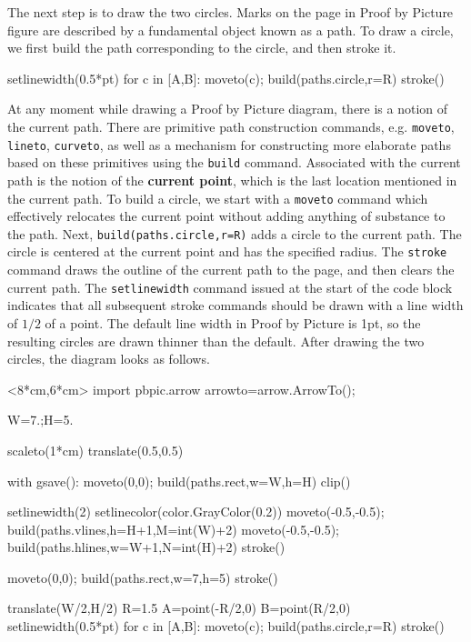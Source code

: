 \documentclass[12pt]{article}
\def\code#1{{\tt #1}}
\def\define#1{{\bf #1}}
\begin{document}
The next step is to draw the two circles.  Marks on the page
in Proof by Picture figure are described by a fundamental object known
as a path.  To draw a circle, we first build the path corresponding
to the circle, and then stroke it.
\begin{snippet}
setlinewidth(0.5*pt)
for c in [A,B]:
  moveto(c);
  build(paths.circle,r=R)
  stroke()
\end{snippet}
At any moment while drawing a Proof by Picture diagram, there is a notion
of the current path.  There are primitive path construction commands, e.g.
\code{moveto}, \code{lineto}, \code{curveto}, as well as a mechanism for
constructing more elaborate paths based on these primitives using the
\code{build} command.  
Associated with the current path is the notion of the \define{current point}, which is the last location mentioned in the current path. 
To build a circle, we start with a \code{moveto} command 
which effectively relocates the current point without 
adding anything of substance to the path.  Next, 
\code{build(paths.circle,r=R)} adds a circle to the current path.
The circle is centered at the current point and has 
the specified radius.  The \code{stroke} command draws the outline
of the current path to the page, and then clears the current path.
The \code{setlinewidth} command issued at the start of the code
block indicates that all subsequent stroke commands should
be drawn with a line width of $1/2$ of a point.  The default
line width in Proof by Picture is 1pt, so the resulting
circles are drawn thinner than the default.
After drawing the two circles, the diagram looks as follows.

\hfil\begin{pbpic}<8*cm,6*cm>
import pbpic.arrow
arrowto=arrow.ArrowTo();

W=7.;H=5.

scaleto(1*cm)
translate(0.5,0.5)

with gsave():
  moveto(0,0); build(paths.rect,w=W,h=H)
  clip()
  
  setlinewidth(2)
  setlinecolor(color.GrayColor(0.2))
  moveto(-0.5,-0.5); build(paths.vlines,h=H+1,M=int(W)+2)
  moveto(-0.5,-0.5); build(paths.hlines,w=W+1,N=int(H)+2)
  stroke()

moveto(0,0); build(paths.rect,w=7,h=5)
stroke()

translate(W/2,H/2)
R=1.5
A=point(-R/2,0)
B=point(R/2,0)
setlinewidth(0.5*pt)
for c in [A,B]:
  moveto(c);
  build(paths.circle,r=R)
  stroke()
\end{pbpic}
\end{document}
